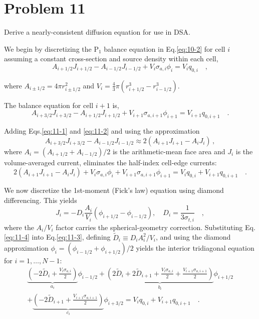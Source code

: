\section*{Problem 11}
Derive a nearly-consistent diffusion equation for use in DSA.
\begin{mybox}
  We begin by discretizing the P$_1$ balance equation in Eq.\eqref{eq:10-2} for cell $i$ assuming a constant cross-section and source density within each cell,
  \begin{equation}
    A_{i+1/2}J_{i+1/2} - A_{i-1/2}J_{i-1/2} + V_i\sigma_{a,i} \phi_i = V_i q_{0,i} \quad,\label{eq:11-1}
  \end{equation}

  where $A_{i\pm1/2} = 4\pi r_{i\pm1/2}^2$ and $V_i = \frac{4}{3}\pi\left(r_{i+1/2}^3 - r_{i-1/2}^3 \right)$.
  
  The balance equation for cell $i+1$ is,
  \begin{equation}
    A_{i+3/2}J_{i+3/2} - A_{i+1/2}J_{i+1/2} + V_{i+1}\sigma_{a,i+1} \phi_{i+1} = V_{i+1} q_{0,i+1} \quad.\label{eq:11-2}
  \end{equation}

  Adding Eqs.\eqref{eq:11-1} and \eqref{eq:11-2} and using the approximation
  \begin{equation}
    A_{i+3/2}J_{i+3/2} - A_{i-1/2} J_{i-1/2} \approx 2(A_{i+1}J_{i+1} - A_iJ_i)\,,\label{eq:11-approx}
  \end{equation}
  where $A_i = (A_{i+1/2}+A_{i-1/2})/2$ is the arithmetic-mean face area and $J_i$ is the volume-averaged current, eliminates the half-index cell-edge currents:
  \begin{equation}
    2(A_{i+1}J_{i+1} - A_i J_i) + V_{i}\sigma_{a,i} \phi_{i} + V_{i+1}\sigma_{a,i+1} \phi_{i+1} = V_{i} q_{0,i}+ V_{i+1} q_{0,i+1}\quad .\label{eq:11-3}
  \end{equation}

  We now discretize the 1st-moment (Fick's law) equation using diamond differencing. This yields
  \begin{equation}
    J_i = -D_i \frac{A_i}{V_i}\left(\phi_{i+1/2} - \phi_{i-1/2}\right), \quad D_i = \frac{1}{3\sigma_{t,i}}\quad,\label{eq:11-4}
  \end{equation}
  where the $A_i/V_i$ factor carries the spherical-geometry correction. Substituting Eq.\eqref{eq:11-4} into Eq.\eqref{eq:11-3}, defining $\widetilde{D}_i \equiv D_i A_i^2/V_i$, and using the diamond approximation $\phi_i = (\phi_{i-1/2}+\phi_{i+1/2})/2$ yields the interior tridiagonal equation for $i = 1,\ldots,N-1$:
  \begin{align*}
    \underbrace{\left(-2\widetilde{D}_i + \tfrac{V_i\sigma_{a,i}}{2}\right)}_{\displaystyle a_i}\phi_{i-1/2}
    + \underbrace{\left(2\widetilde{D}_i + 2\widetilde{D}_{i+1} + \tfrac{V_i\sigma_{a,i}}{2} + \tfrac{V_{i+1}\sigma_{a,i+1}}{2}\right)}_{\displaystyle b_i}\phi_{i+1/2}
    \\+ \underbrace{\left(-2\widetilde{D}_{i+1} + \tfrac{V_{i+1}\sigma_{a,i+1}}{2}\right)}_{\displaystyle c_i}\phi_{i+3/2}
    = V_i q_{0,i} + V_{i+1} q_{0,i+1}\quad .\label{eq:11-5}
  \end{align*}


\end{mybox}
